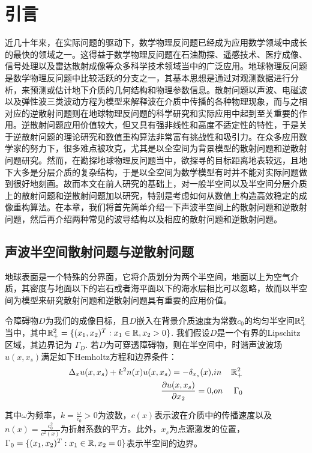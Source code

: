 \chapter{引言}\label{chap:fundamental}

近几十年来，在实际问题的驱动下，数学物理反问题已经成为应用数学领域中成长的最快的领域之一。这得益于数学物理反问题在石油勘探、遥感技术、医疗成像、信号处理以及雷达散射成像等众多科学技术领域当中的广泛应用。地球物理反问题是数学物理反问题中比较活跃的分支之一，其基本思想是通过对观测数据进行分析，来预测或估计地下介质的几何结构和物理参数信息。散射问题以声波、电磁波以及弹性波三类波动方程为模型来解释波在介质中传播的各种物理现象，而与之相对应的逆散射问题则在地球物理反问题的科学研究和实际应用中起到至关重要的作用。逆散射问题应用价值较大，但又具有强非线性和高度不适定性的特性，于是关于逆散射问题的理论研究和数值重构算法非常富有挑战性和吸引力。在众多应用数学家的努力下，很多难点被攻克，尤其是以全空间为背景模型的散射问题和逆散射问题研究。然而，在勘探地球物理反问题当中，欲探寻的目标距离地表较远，且地下大多是分层介质的复杂结构，于是以全空间为数学模型有时并不能对实际问题做到很好地刻画。故而本文在前人研究的基础上，对一般半空间以及半空间分层介质上的散射问题和逆散射问题加以研究，特别是考虑如何从数值上构造高效稳定的成像重构算法。在本章，我们将首先简单介绍一下声波半空间上的散射问题和逆散射问题，然后再介绍两种常见的波导结构以及相应的散射问题和逆散射问题。
\section{声波半空间散射问题与逆散射问题}
地球表面是一个特殊的分界面，它将介质划分为两个半空间，地面以上为空气介质，其密度与地面以下的岩石或者海平面以下的海水层相比可以忽略，故而以半空间为模型来研究散射问题和逆散射问题具有重要的应用价值。

令障碍物$D$为我们的成像目标，且$D$嵌入在背景介质速度为常数$c_0$的均匀半空间$\mathbb{R}^2_+$当中，其中$\mathbb{R}^2_+=\{(x_1,x_2)^T:x_1\in\mathbb{R},x_2>0\}$. 我们假设$D$是一个有界的Lipschitz 区域，其边界记为 $\Gamma_D$. 若$D$为可穿透障碍物，则在半空间中，时谐声波波场$u(x,x_s)$满足如下Hemholtz方程和边界条件：
\begin{eqnarray}
 \Delta_x u(x,x_s)+k^2n(x)u(x,x_s)=-\delta_{x_s}(x),&in&\mathbb{R}^2_+   \label{into_p1_1}\\
 \frac{\partial u(x,x_s)}{\partial x_2}=0,&on&\Gamma_0  \label{into_p1_2}
\end{eqnarray}

其中$\omega$为频率，$k=\frac{\omega}{c_0}>0$为波数，$c(x)$表示波在介质中的传播速度以及$n(x)=\frac{c_0^2}{c^2(x)}$为折射系数的平方。此外，$x_s$为点源激发的位置，$\Gamma_0=\{(x_1,x_2)^T:x_1\in\mathbb{R},x_2=0\}$表示半空间的边界。

